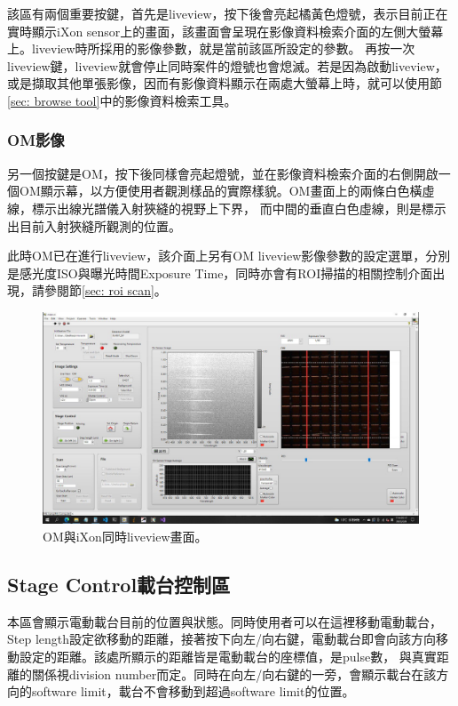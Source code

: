 \documentclass[12pt]{article}
\begin{document}
    該區有兩個重要按鍵，首先是liveview，按下後會亮起橘黃色燈號，表示目前正在實時顯示iXon sensor上的畫面，該畫面會呈現在影像資料檢索介面的左側大螢幕上。liveview時所採用的影像參數，就是當前該區所設定的參數。
    再按一次liveview鍵，liveview就會停止同時案件的燈號也會熄滅。若是因為啟動liveview，或是擷取其他單張影像，因而有影像資料顯示在兩處大螢幕上時，就可以使用節\ref{sec: browse tool}中的影像資料檢索工具。
    \subsubsection{OM影像}
    另一個按鍵是OM，按下後同樣會亮起燈號，並在影像資料檢索介面的右側開啟一個OM顯示幕，以方便使用者觀測樣品的實際樣貌。OM畫面上的兩條白色橫虛線，標示出線光譜儀入射狹縫的視野上下界，
    而中間的垂直白色虛線，則是標示出目前入射狹縫所觀測的位置。
    
    此時OM已在進行liveview，該介面上另有OM liveview影像參數的設定選單，分別是感光度ISO與曝光時間Exposure Time，同時亦會有ROI掃描的相關控制介面出現，請參閱節\ref{sec: roi scan}。
    \begin{figure}[h]
        \centering
        \includegraphics[width=\linewidth]{roi.jpeg}
        \caption{OM與iXon同時liveview畫面。}
        \label{fig: liveview}
    \end{figure}

    \subsection{Stage Control載台控制區}
    本區會顯示電動載台目前的位置與狀態。同時使用者可以在這裡移動電動載台，Step length設定欲移動的距離，接著按下向左/向右鍵，電動載台即會向該方向移動設定的距離。該處所顯示的距離皆是電動載台的座標值，是pulse數，
    與真實距離的關係視division number而定。同時在向左/向右鍵的一旁，會顯示載台在該方向的software limit，載台不會移動到超過software limit的位置。
\end{document}
